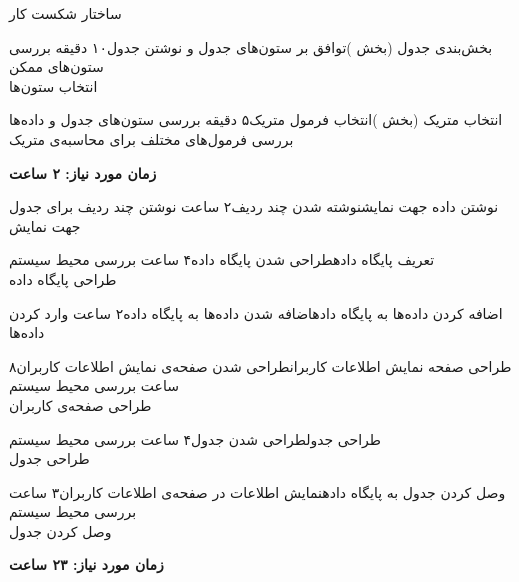 \begin{wbsbox}{ساختار شکست کار}
\begin{wbssub}{بخش‌بندی جدول (بخش )}{توافق بر ستون‌های جدول و نوشتن جدول}{۱۰ دقیقه}
\task بررسی ستون‌های ممکن \\
\task انتخاب ستون‌ها
\end{wbssub}

\begin{wbssub}{انتخاب متریک (بخش )}{انتخاب فرمول متریک}{۵ دقیقه}
\task بررسی ستون‌های جدول و داده‌ها\\
\task بررسی فرمول‌های مختلف ‌برای محاسبه‌ی متریک
\end{wbssub}
\begin{center}
\textbf{زمان مورد نیاز: ۲ ساعت}
\end{center}

\begin{wbssub}{نوشتن داده جهت نمایش}{نوشته شدن چند ردیف}{۲ ساعت}
\task نوشتن چند ردیف برای جدول جهت نمایش
\end{wbssub}

\begin{wbssub}{تعریف پایگاه داده}{طراحی شدن پایگاه داده}{۴ ساعت}
\task بررسی محیط سیستم  \\
\task طراحی پایگاه داده
\end{wbssub}

\begin{wbssub}{اضافه کردن داده‌ها به پایگاه داده}{اضافه شدن داده‌ها به پایگاه داده}{۲ ساعت}
\task وارد کردن داده‌ها
\end{wbssub}

\begin{wbssub}{طراحی صفحه نمایش اطلاعات کاربران}{طراحی شدن صفحه‌ی نمایش اطلاعات کاربران}{۸ ساعت}
\task بررسی محیط سیستم  \\
\task طراحی صفحه‌ی کاربران
\end{wbssub}

\begin{wbssub}{طراحی جدول}{طراحی شدن جدول}{۴ ساعت}
\task بررسی محیط سیستم  \\
\task طراحی جدول
\end{wbssub}

\begin{wbssub}{وصل کردن جدول به پایگاه داده}{نمایش اطلاعات در صفحه‌ی اطلاعات کاربران}{۳ ساعت}
\task بررسی محیط سیستم  \\
\task وصل کردن جدول
\end{wbssub}
\begin{center}
\textbf{زمان مورد نیاز: ۲۳ ساعت}
\end{center}


\end{wbsbox}
